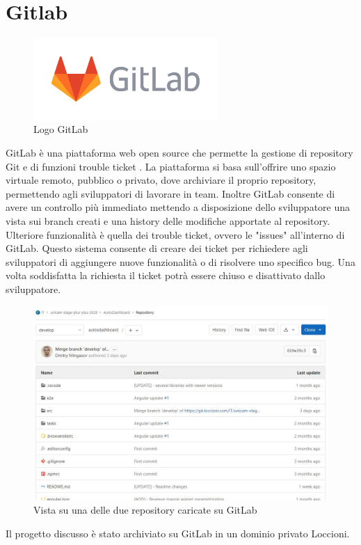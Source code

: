 \pagebreak
\section{Gitlab}
\begin{figure}[ht!]
\begin{center}
  \includegraphics[width=7cm]{images/gitlab_logo.png}
  \caption{Logo GitLab}
\end{center}
\end{figure}
GitLab è una piattaforma web open source che permette la gestione di repository Git e di funzioni trouble ticket \cite{GITLAB}.
La piattaforma si basa sull'offrire uno spazio virtuale remoto, pubblico o privato, dove archiviare il proprio repository, permettendo agli sviluppatori di lavorare in team.
Inoltre GitLab consente di avere un controllo più immediato mettendo a disposizione dello sviluppatore una vista sui branch creati e una history delle modifiche apportate al repository.
Ulteriore funzionalità è quella dei trouble ticket, ovvero le "issues" all'interno di GitLab. Questo sistema consente di creare dei ticket per richiedere agli sviluppatori di aggiungere nuove funzionalità o di risolvere uno specifico bug. Una volta soddisfatta la richiesta il ticket potrà essere chiuso e disattivato dallo sviluppatore.
\begin{figure}[ht!]
\begin{center}
  \includegraphics[width=13cm]{images/Repository_GitLab.JPG}
  \caption{Vista su una delle due repository caricate su GitLab}
\end{center}
\end{figure}
Il progetto discusso è stato archiviato su GitLab in un dominio privato Loccioni.

